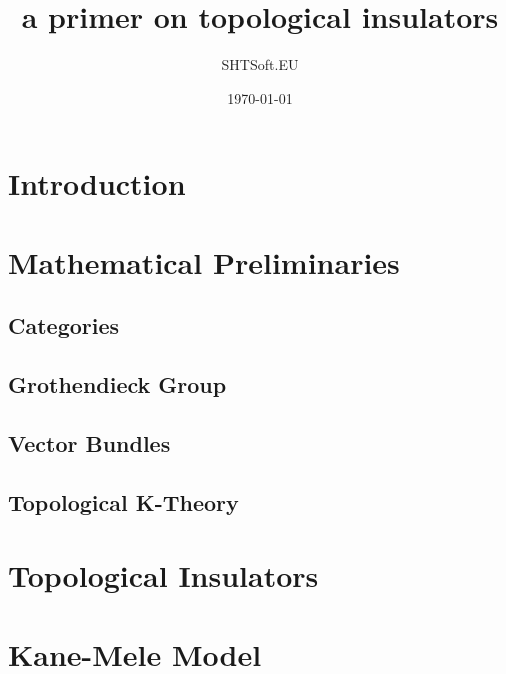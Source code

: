 \documentclass[a4paper,11pt,psamsfonts,reqno]{amsart}
\newcounter{prpcounter}
\theoremstyle{proposition}
\theoremstyle{proof}
\begin{document}
\title{a primer on topological insulators}
\author{SHTSoft.EU}
\date{\today}
\maketitle
\tableofcontents

\setcounter{prpcounter}{0}





\section{Introduction}
\label{sec:intro}



\section{Mathematical Preliminaries}
\label{sec:mathpre}


\subsection*{Categories}
\label{sec:categories}


\subsection*{Grothendieck Group}
\label{sec:grothengr}


\subsection*{Vector Bundles}
\label{sec:vb}


\subsection*{Topological K-Theory}
\label{sec:topktheory}



\section{Topological Insulators}
\label{sec:topins}



\section{Kane-Mele Model}
\label{sec:kmm}



\nocite{wiki-pedia0en}



\end{document}
